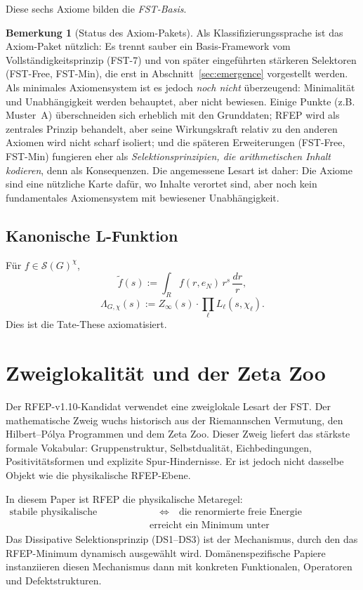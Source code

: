 \documentclass[11pt,a4paper]{article}
\theoremstyle{plain}
\theoremstyle{definition}
\newtheorem{remark}[theorem]{Bemerkung}
\renewcommand{\S}{\mathcal{S}}
\newcommand{\chifn}{\chi}
\begin{document}
Diese sechs Axiome bilden die \emph{FST-Basis}.

\begin{remark}[Status des Axiom-Pakets]
\label{rem:axioms-status}
Als Klassifizierungssprache ist das Axiom-Paket nützlich: Es trennt sauber ein Basis-Framework vom Vollständigkeitsprinzip (FST-7) und von später eingeführten stärkeren Selektoren (FST-Free, FST-Min), die erst in Abschnitt~\ref{sec:emergence} vorgestellt werden. Als minimales Axiomensystem ist es jedoch \emph{noch nicht} überzeugend: Minimalität und Unabhängigkeit werden behauptet, aber nicht bewiesen. Einige Punkte (z.B. Muster~A) überschneiden sich erheblich mit den Grunddaten; RFEP wird als zentrales Prinzip behandelt, aber seine Wirkungskraft relativ zu den anderen Axiomen wird nicht scharf isoliert; und die späteren Erweiterungen (FST-Free, FST-Min) fungieren eher als \emph{Selektionsprinzipien, die arithmetischen Inhalt kodieren}, denn als Konsequenzen. Die angemessene Lesart ist daher: Die Axiome sind eine nützliche Karte dafür, wo Inhalte verortet sind, aber noch kein fundamentales Axiomensystem mit bewiesener Unabhängigkeit.
\end{remark}

\subsection{Kanonische L-Funktion}

Für $f \in \S(G)^\chifn$,
\[
  \tilde f(s) := \int_R f(r, e_N) \, r^s \, \frac{dr}{r},
\]
\[
  \Lambda_{G,\chifn}(s) := Z_\infty(s) \cdot \prod_\ell
    L_\ell(s, \chifn_\ell).
\]
Dies ist die Tate-These \cite{Tate1950} axiomatisiert.

\section{Zweiglokalität und der Zeta Zoo}
\label{sec:branch-locality}

Der RFEP-v1.10-Kandidat verwendet eine zweiglokale Lesart der FST. Der mathematische
Zweig wuchs historisch aus der Riemannschen Vermutung, den Hilbert--P\'olya
Programmen und dem Zeta Zoo. Dieser Zweig liefert das stärkste
formale Vokabular: Gruppenstruktur, Selbstdualität, Eichbedingungen,
Positivitätsformen und explizite Spur-Hindernisse. Er ist jedoch nicht dasselbe
Objekt wie die physikalische RFEP-Ebene.

In diesem Paper ist RFEP die physikalische Metaregel:
\[
\begin{aligned}
  \text{stabile physikalische Evolution}
  &\quad\Longleftrightarrow\quad
  \text{die renormierte freie Energie}\\
  &\text{erreicht ein Minimum unter Nebenbedingungen.}
\end{aligned}
\]
Das Dissipative Selektionsprinzip (DS1--DS3) ist der Mechanismus, durch den
das RFEP-Minimum dynamisch ausgewählt wird. Domänenspezifische Papiere instanziieren diesen Mechanismus dann mit konkreten Funktionalen, Operatoren und Defektstrukturen.
\end{document}
